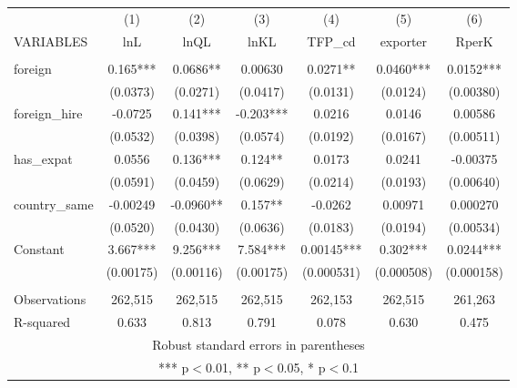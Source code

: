 \documentclass[]{article}
\begin{document}
\begin{tabular}{lcccccc} \hline
 & (1) & (2) & (3) & (4) & (5) & (6) \\
VARIABLES & lnL & lnQL & lnKL & TFP\_cd & exporter & RperK \\ \hline
 &  &  &  &  &  &  \\
foreign & 0.165*** & 0.0686** & 0.00630 & 0.0271** & 0.0460*** & 0.0152*** \\
 & (0.0373) & (0.0271) & (0.0417) & (0.0131) & (0.0124) & (0.00380) \\
foreign\_hire & -0.0725 & 0.141*** & -0.203*** & 0.0216 & 0.0146 & 0.00586 \\
 & (0.0532) & (0.0398) & (0.0574) & (0.0192) & (0.0167) & (0.00511) \\
has\_expat & 0.0556 & 0.136*** & 0.124** & 0.0173 & 0.0241 & -0.00375 \\
 & (0.0591) & (0.0459) & (0.0629) & (0.0214) & (0.0193) & (0.00640) \\
country\_same & -0.00249 & -0.0960** & 0.157** & -0.0262 & 0.00971 & 0.000270 \\
 & (0.0520) & (0.0430) & (0.0636) & (0.0183) & (0.0194) & (0.00534) \\
Constant & 3.667*** & 9.256*** & 7.584*** & 0.00145*** & 0.302*** & 0.0244*** \\
 & (0.00175) & (0.00116) & (0.00175) & (0.000531) & (0.000508) & (0.000158) \\
 &  &  &  &  &  &  \\
Observations & 262,515 & 262,515 & 262,515 & 262,153 & 262,515 & 261,263 \\
 R-squared & 0.633 & 0.813 & 0.791 & 0.078 & 0.630 & 0.475 \\ \hline
\multicolumn{7}{c}{ Robust standard errors in parentheses} \\
\multicolumn{7}{c}{ *** p$<$0.01, ** p$<$0.05, * p$<$0.1} \\
\end{tabular}
\end{document}
